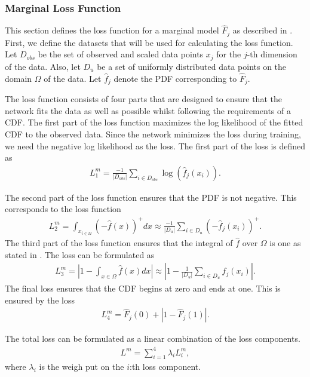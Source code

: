 \subsubsection{Marginal Loss Function}\label{sec:NeuralMarginalLoss}
This section defines the loss function for a marginal model $\hat{F}_j$ as described in . First, we define the datasets that will be used for calculating the loss function. Let $D_{obs}$ be the set of observed and scaled data points $x_j$ for the $j$-th dimension of the data. Also, let $D_u$ be a set of uniformly distributed data points on the domain $\Omega$ of the data. Let $\hat{f}_j$ denote the \gls{PDF} corresponding to $\hat{F}_j$.

The loss function consists of four parts that are designed to ensure that the network fits the data as well as possible whilst following the requirements of a \gls{CDF}. The first part of the loss function maximizes the log likelihood of the fitted \gls{CDF} to the observed data. Since the network minimizes the loss during training, we need the negative log likelihood as the loss. The first part of the loss is defined as
\begin{align*}
    L_1^m = \frac{-1}{|D_{obs}|} \sum_{i \in D_{obs}} \log(\hat{f}_j(x_i)).
\end{align*}

The second part of the loss function ensures that the \gls{PDF} is not negative. This corresponds to the loss function 
\begin{align*}
    L_2^m = \int_{x_{i\in\Omega}} (-\hat{f}(x))^+dx \approx \frac{-1}{|D_{u}|} \sum_{i \in D_{u}} (-\hat{f}_j(x_i))^+.
\end{align*}
The third part of the loss function ensures that the integral of $\hat{f}$ over $\Omega$ is one as stated in . The loss can be formulated as 
\begin{align*}
    L_3^m = \left | 1- \int_{x\in \Omega} \hat{f}(x) dx    \right | \approx \left | 1- \frac{1}{|D_{u}|} \sum_{i \in D_{u}} \hat{f}_j(x_i)  \right |.
\end{align*}
The final loss ensures that the \gls{CDF} begins at zero and ends at one. This is ensured by the loss
\begin{align*}
    L_4^m = \hat{F}_j(0) + |1- \hat{F}_j(1) |.
\end{align*}

The total loss can be formulated as a linear combination of the loss components. 
\begin{align*}
    L^m = \sum_{i=1}^4 \lambda_i L_i^m,
\end{align*}
where $\lambda_i$ is the weigh put on the $i$:th loss component. 

